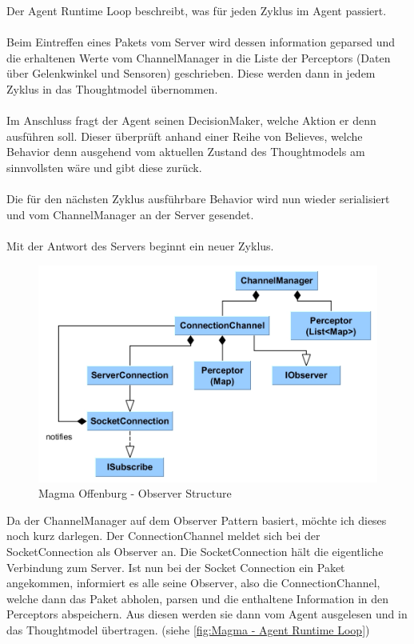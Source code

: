 \documentclass[fontsize=12pt,a4paper,final]{scrartcl}[2003/01/01]
\begin{document}
Der Agent Runtime Loop beschreibt, was für jeden Zyklus im Agent passiert.\\
\\
Beim Eintreffen eines Pakets vom Server wird dessen information geparsed und die erhaltenen Werte vom ChannelManager in die Liste der Perceptors (Daten über Gelenkwinkel und Sensoren) geschrieben.
Diese werden dann in jedem Zyklus in das Thoughtmodel übernommen.\\
\\
Im Anschluss fragt der Agent seinen DecisionMaker, welche Aktion er denn ausführen soll. Dieser überprüft anhand einer Reihe von Believes, welche Behavior denn ausgehend vom aktuellen Zustand des Thoughtmodels am sinnvollsten wäre und gibt diese zurück.\\
\\
Die für den nächsten Zyklus ausführbare Behavior wird nun wieder serialisiert und vom ChannelManager an der Server gesendet.\\
\\
Mit der Antwort des Servers beginnt ein neuer Zyklus.

\begin{figure}[H]
	\centering
	\includegraphics[width=\textwidth]{Grafiken/Magma/Observer_Structure}
	\caption{Magma Offenburg - Observer Structure}
	\label{fig:Magma - Observer Structure}
\end{figure}

Da der ChannelManager auf dem Observer Pattern basiert, möchte ich dieses noch kurz darlegen. Der ConnectionChannel meldet sich bei der SocketConnection als Observer an. Die SocketConnection hält die eigentliche Verbindung zum Server. Ist nun bei der Socket Connection ein Paket angekommen, informiert es alle seine Observer, also die ConnectionChannel, welche dann das Paket abholen, parsen und die enthaltene Information in den Perceptors abspeichern. Aus diesen werden sie dann vom Agent ausgelesen und in das Thoughtmodel übertragen. (siehe \autoref{fig:Magma - Agent Runtime Loop})
\end{document}
